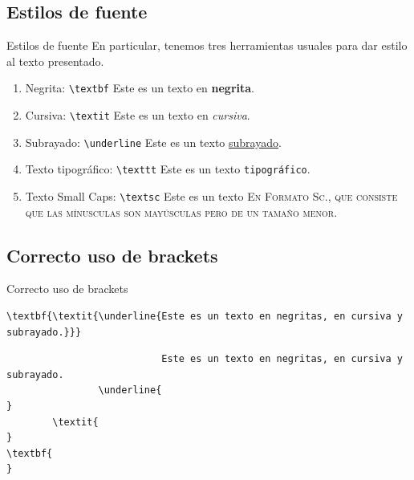 \documentclass[../slides.tex]{subfiles}
\begin{document}
    \subsection{Estilos de fuente}
    \begin{frame}{Estilos de fuente}
        En particular, tenemos tres herramientas usuales para dar estilo al texto presentado.
            \begin{enumerate}
                \item Negrita: \texttt{\textbackslash textbf} Este es un texto en \textbf{negrita}.
                    
                \item Cursiva: \texttt{\textbackslash textit} Este es un texto en \textit{cursiva}.
                \item Subrayado: \texttt{\textbackslash underline} Este es un texto \underline{subrayado}.
                \item Texto tipográfico: \texttt{\textbackslash texttt} Este es un texto \texttt{tipográfico}.
                \item Texto Small Caps: \texttt{\textbackslash textsc} Este es un texto \textsc{En Formato Sc., que consiste que las mínusculas son mayúsculas pero de un tamaño menor}.
            \end{enumerate}
    \end{frame}

    \subsection{Correcto uso de brackets}
    \begin{frame}[fragile]{Correcto uso de brackets}
\scriptsize{
        \begin{verbatim}
\textbf{\textit{\underline{Este es un texto en negritas, en cursiva y subrayado.}}}
        \end{verbatim}
        
        \begin{verbatim}
                           Este es un texto en negritas, en cursiva y subrayado.
                \underline{                                                     }
        \textit{                                                                 }
\textbf{                                                                          }
        \end{verbatim}
}
    \end{frame}
    
\end{document}
